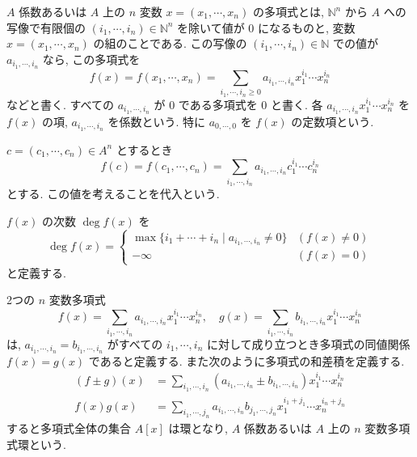 \documentclass[uplatex,dvipdfmx,a4paper,11pt]{jlreq}
\theoremstyle{definition}
\begin{document}
\begin{definition}[$n$ 変数多項式]
  $A$ 係数あるいは $A$ 上の $n$ 変数 $x = (x_1,\cdots,x_n)$ の多項式とは, $\mathbb{N}^n$ から $A$ への写像で有限個の $(i_1,\cdots,i_n)\in\mathbb{N}^n$ を除いて値が $0$ になるものと, 変数 $x = (x_1,\cdots,x_n)$ の組のことである. この写像の $(i_1,\cdots,i_n)\in\mathbb{N}$ での値が $a_{i_1,\cdots,i_n}$ なら, この多項式を
  $$
    f(x) = f(x_1,\cdots,x_n) = \sum_{i_1,\cdots,i_n\geq 0}a_{i_1,\cdots,i_n}x_1^{i_1}\cdots x_n^{i_n}
  $$
  などと書く. すべての $a_{i_1,\cdots,i_n}$ が $0$ である多項式を $0$ と書く. 各 $a_{i_1,\cdots,i_n}x_1^{i_1}\cdots x_n^{i_n}$ を $f(x)$ の項, $a_{i_1,\cdots,i_n}$ を係数という. 特に $a_{0,\cdots,0}$ を $f(x)$ の定数項という.
\end{definition}
\begin{definition}[$n$ 変数多項式の代入]
  $c = (c_1,\cdots,c_n) \in A^n$ とするとき
  $$
    f(c) = f(c_1,\cdots,c_n) = \sum_{i_1,\cdots,i_n}a_{i_1,\cdots,i_n}c_1^{i_1}\cdots c_n^{i_n}
  $$
  とする. この値を考えることを代入という.
\end{definition}
\begin{definition}[$n$ 変数多項式の次数]
  $f(x)$ の次数 $\deg f(x)$ を
  $$
    \deg f(x) = \begin{cases}
      \max\lbrace i_1 + \cdots + i_n \mid a_{i_1,\cdots,i_n} \neq 0 \rbrace & (f(x) \neq 0) \\
      -\infty                                                               & (f(x) = 0)
    \end{cases}
  $$
  と定義する.
\end{definition}
\begin{definition}
  2つの $n$ 変数多項式
  $$
    f(x) = \sum_{i_1,\cdots,i_n}a_{i_1,\cdots,i_n}x_1^{i_1}\cdots x_n^{i_n}, \quad g(x) = \sum_{i_1,\cdots,i_n}b_{i_1,\cdots,i_n}x_1^{i_1}\cdots x_n^{i_n}
  $$
  は, $a_{i_1,\cdots,i_n} = b_{i_1,\cdots,i_n}$ がすべての $i_1,\cdots,i_n$ に対して成り立つとき多項式の同値関係 $f(x) = g(x)$ であると定義する. また次のように多項式の和差積を定義する.
  \begin{align}
    (f\pm g)(x) & = \sum_{i_1,\cdots,i_n}(a_{i_1,\cdots,i_n}\pm b_{i_1,\cdots,i_n})x_1^{i_1}\cdots x_n^{i_n}   \\
    f(x)g(x)    & = \sum_{i_1,\cdots,j_n}a_{i_1,\cdots,i_n}b_{j_1,\cdots,j_n}x_1^{i_1+j_1}\cdots x_n^{i_n+j_n}
  \end{align}
  すると多項式全体の集合 $A[x]$ は環となり, $A$ 係数あるいは $A$ 上の $n$ 変数多項式環という.
\end{definition}
\end{document}
